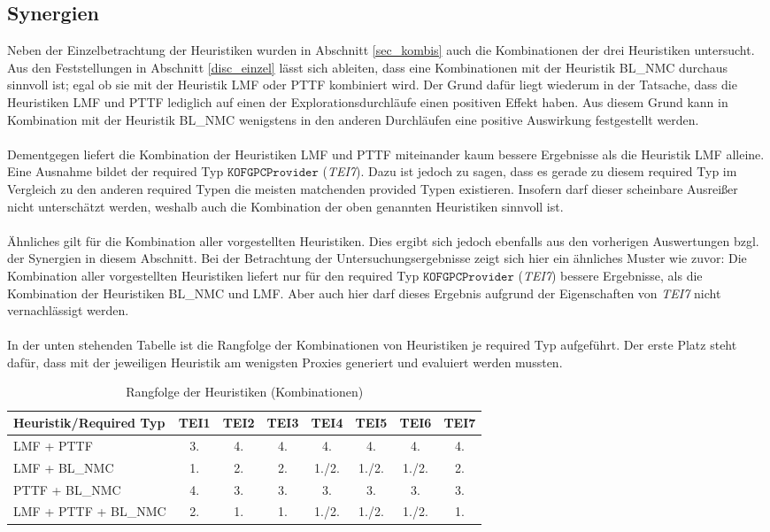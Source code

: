 \subsection{Synergien}
Neben der Einzelbetrachtung der Heuristiken wurden in Abschnitt \ref{sec_kombis} auch die Kombinationen der drei Heuristiken untersucht. Aus den Feststellungen in Abschnitt \ref{disc_einzel} lässt sich ableiten, dass eine Kombinationen mit der Heuristik BL\_NMC durchaus sinnvoll ist; egal ob sie mit der Heuristik LMF oder PTTF kombiniert wird. Der Grund dafür liegt wiederum in der Tatsache, dass die Heuristiken LMF und PTTF lediglich auf einen der Explorationsdurchläufe einen positiven Effekt haben. Aus diesem Grund kann in Kombination mit der Heuristik BL\_NMC wenigstens in den anderen Durchläufen eine positive Auswirkung festgestellt werden.
\\\\
Dementgegen liefert die Kombination der Heuristiken LMF und PTTF miteinander kaum bessere Ergebnisse als die Heuristik LMF alleine. Eine Ausnahme bildet der required Typ $\texttt{KOFGPCProvider}$ (\emph{TEI7}). Dazu ist jedoch zu sagen, dass es gerade zu diesem required Typ im Vergleich zu den anderen required Typen die meisten matchenden provided Typen existieren. Insofern darf dieser scheinbare Ausreißer nicht unterschätzt werden, weshalb auch die Kombination der oben genannten Heuristiken sinnvoll ist.
\\\\
Ähnliches gilt für die Kombination aller vorgestellten Heuristiken. Dies ergibt sich jedoch ebenfalls aus den vorherigen Auswertungen bzgl. der Synergien in diesem Abschnitt. Bei der Betrachtung der Untersuchungsergebnisse zeigt sich hier ein ähnliches Muster wie zuvor: Die Kombination aller vorgestellten Heuristiken liefert nur für den required Typ $\texttt{KOFGPCProvider}$ (\emph{TEI7}) bessere Ergebnisse, als die Kombination der Heuristiken BL\_NMC und LMF. Aber auch hier darf dieses Ergebnis aufgrund der Eigenschaften von \emph{TEI7} nicht vernachlässigt werden.
\\\\
In der unten stehenden Tabelle ist die Rangfolge der Kombinationen von Heuristiken je required Typ aufgeführt. Der erste Platz steht dafür, dass mit der jeweiligen Heuristik am wenigsten Proxies generiert und evaluiert werden mussten.
\begin{table}[!h]
\centering
\begin{tabular}{|l|c|c|c|c|c|c|c|}
\hline
\hline
\textbf{Heuristik/Required Typ} & \textbf{TEI1} & \textbf{TEI2}& \textbf{TEI3}& \textbf{TEI4}& \textbf{TEI5}& \textbf{TEI6}& \textbf{TEI7}\\
\hline
\hline
LMF + PTTF &3.&4.&4.&4.&4.&4.&4.\\
\hline
LMF + BL\_NMC &1. &2.&2.&1./2.&1./2.&1./2.&2. \\
\hline
PTTF + BL\_NMC &4. &3.&3.&3.&3.&3.& 3.\\
\hline
LMF + PTTF + BL\_NMC &2. &1. &1. & 1./2.&1./2.&1./2.&1.\\
\hline
\hline
\end{tabular}
\caption{Rangfolge der Heuristiken (Kombinationen)}
\end{table}
